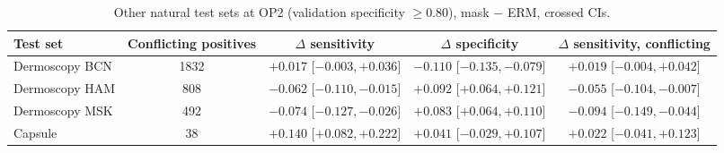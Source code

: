 \begin{table}[H]\centering\scriptsize
\caption{Other natural test sets at OP2 (validation specificity $\ge0.80$), mask $-$ ERM, crossed CIs.}\label{tab:opother}
\begin{tabular}{lcccc}\toprule
Test set & Conflicting positives & $\Delta$ sensitivity & $\Delta$ specificity & $\Delta$ sensitivity, conflicting \\\midrule
Dermoscopy BCN & 1832 & $+0.017$ [$-0.003, +0.036$] & $-0.110$ [$-0.135, -0.079$] & $+0.019$ [$-0.004, +0.042$] \\
Dermoscopy HAM & 808 & $-0.062$ [$-0.110, -0.015$] & $+0.092$ [$+0.064, +0.121$] & $-0.055$ [$-0.104, -0.007$] \\
Dermoscopy MSK & 492 & $-0.074$ [$-0.127, -0.026$] & $+0.083$ [$+0.064, +0.110$] & $-0.094$ [$-0.149, -0.044$] \\
Capsule & 38 & $+0.140$ [$+0.082, +0.222$] & $+0.041$ [$-0.029, +0.107$] & $+0.022$ [$-0.041, +0.123$] \\
\bottomrule\end{tabular}
\end{table}
